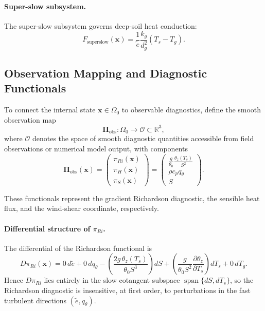 \paragraph{Super-slow subsystem.}
The super-slow subsystem governs deep-soil heat conduction:
\begin{equation}
F_{\mathrm{superslow}}(\mathbf{x})
= \frac{1}{\tilde e}\frac{k_g}{d_g^2}(T_s - T_g).
\end{equation}

\subsection{Observation Mapping and Diagnostic Functionals}

To connect the internal state $\mathbf{x} \in \Omega_0$ to observable diagnostics, define the smooth observation map
\begin{equation}
\boldsymbol{\Pi}_{\mathrm{obs}} : \Omega_0 \to \mathcal O \subset \mathbb{R}^3,
\end{equation}
where $\mathcal O$ denotes the space of smooth diagnostic quantities accessible from field observations or numerical model output,
with components
\begin{equation}
\boldsymbol{\Pi}_{\mathrm{obs}}(\mathbf{x})
= \begin{pmatrix}
\pi_{Ri}(\mathbf{x}) \\
\pi_H(\mathbf{x}) \\
\pi_S(\mathbf{x})
\end{pmatrix}
= \begin{pmatrix}
\frac{g}{\theta_0}\frac{\theta_z(T_s)}{S^2} \\
\rho c_p q_\theta \\
S
\end{pmatrix}.
\end{equation}

These functionals represent the gradient Richardson diagnostic, the sensible heat flux, and the wind-shear coordinate, respectively.

\paragraph{Differential structure of $\pi_{Ri}$.}
The differential of the Richardson functional is
\begin{equation}
D\pi_{Ri}(\mathbf{x})
= 0\,d\tilde e
+ 0\,dq_\theta
- \left(\frac{2g\,\theta_z(T_s)}{\theta_0 S^3}\right)dS
+ \left(\frac{g}{\theta_0 S^2}\frac{\partial \theta_z}{\partial T_s}\right)dT_s
+ 0\,dT_g.
\end{equation}
Hence $D\pi_{Ri}$ lies entirely in the slow cotangent subspace $\operatorname{span}\{dS,dT_s\}$, so the Richardson diagnostic is insensitive, at first order, to perturbations in the fast turbulent directions $(\tilde e,q_\theta)$.

